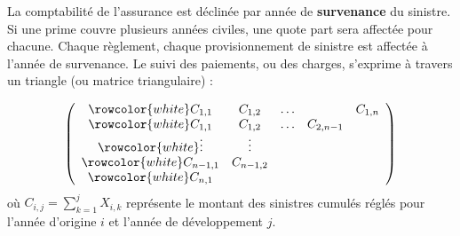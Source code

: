 \begin{f}
	
	La comptabilité de l'assurance est déclinée par année de \textbf{survenance} du sinistre. 
	Si une prime couvre plusieurs années civiles, une quote part sera affectée pour chacune.
	Chaque règlement, chaque provisionnement de sinistre est affectée à l'année de survenance. 
	Le suivi des paiements, ou des charges, s'exprime à travers  un triangle (ou matrice triangulaire) :
	
	\[
	\left(\begin{array}{ccccc}
		\rowcolor{white}	C_{1,1} & C_{1,2} & \ldots & & C_{1, n} \\
		\rowcolor{white}	C_{1,1} & C_{1,2} & \ldots & C_{2, n-1} \\
		\rowcolor{white}	\vdots & \vdots & & \\
		\rowcolor{white}	C_{n-1,1} & C_{n-1,2} & & \\
		\rowcolor{white}	C_{n, 1} & & &
	\end{array}\right)
	\]
	où \(C_{i, j}=\sum_{k=1}^{j} X_{i, k}\) représente le montant des sinistres cumulés  réglés pour l'année d'origine \(i\) et l'année de développement \(j\).
	
\end{f}


